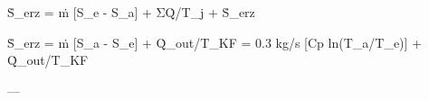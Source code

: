 Ṡ_erz = ṁ [S_e - S_a] + ΣQ̇/T_j + Ṡ_erz  

Ṡ_erz = ṁ [S_a - S_e] + Q̇_out/T_KF  
= 0.3 kg/s [Cp ln(T_a/T_e)] + Q̇_out/T_KF  

---